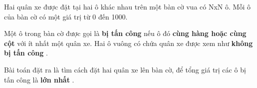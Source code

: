 Hai quân xe được đặt tại hai ô khác nhau trên một bàn cờ vua có NxN ô. Mỗi ô của bàn cờ có một giá trị từ 0 đến 1000.

Một ô trong bàn cờ được gọi là \textbf{ bị tấn công } nếu ô đó \textbf{ cùng hàng hoặc cùng cột } với ít nhất một quân xe. Hai ô vuông có chứa quân xe được xem như \textbf{ không bị tấn công } .

Bài toán đặt ra là tìm cách đặt hai quân xe lên bàn cờ, để tổng giá trị các ô bị tấn công là \textbf{ lớn nhất } .